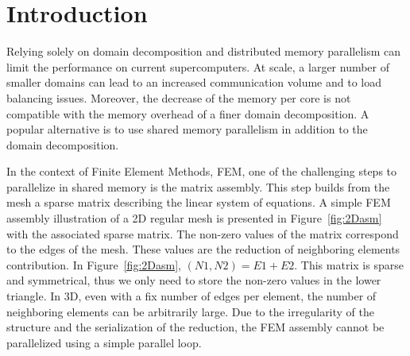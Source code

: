\documentclass[10pt]{IOS-Book-Article}
\begin{document}
\section{Introduction}
\label{sec:intro}


Relying solely on domain decomposition and distributed memory parallelism can limit the performance on current supercomputers.
At scale, a larger number of smaller domains can lead to an increased communication volume and to load balancing issues.
Moreover, the decrease of the memory per core is not compatible with the memory overhead of a finer domain decomposition.
A popular alternative is to use shared memory parallelism in addition to the domain decomposition.

In the context of Finite Element Methods, FEM, one of the challenging steps to parallelize in shared memory is the matrix assembly.
This step builds from the mesh a sparse matrix describing the linear system of equations.
A simple FEM assembly illustration of a 2D regular mesh is presented in Figure~\ref{fig:2Dasm} with the associated sparse matrix.
The non-zero values of the matrix correspond to the edges of the mesh. These values are the reduction of neighboring elements contribution.
 In Figure~\ref{fig:2Dasm}, $(N1,N2) = E1 + E2$. This matrix is sparse and symmetrical, thus we only need to store the non-zero values in the lower triangle. In 3D, even with a fix number of edges per element, the number of neighboring elements can be arbitrarily large.
Due to the irregularity of the structure and the serialization of the reduction, the FEM assembly cannot be parallelized using a simple parallel loop.
\end{document}
